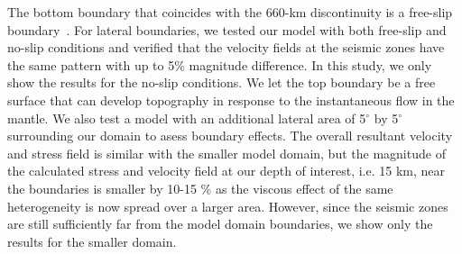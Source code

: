 \documentclass[draft,linenumbers]{agujournal2018}
\begin{document}
The bottom boundary that coincides with the 660-km discontinuity is a free-slip boundary~\citep[e.g.,][]{arcay2007slab, billen2007rheologic, quinquis2011role}. For lateral boundaries, we tested our model with both free-slip and no-slip conditions and verified that the velocity fields at the seismic zones have the same pattern with up to 5\% magnitude difference. In this study, we only show the results for the no-slip conditions. We let the top boundary be a free surface
that can develop topography in response to the instantaneous flow in the mantle. We also test a model with an additional lateral area of 5$^{\circ}$ by 5$^{\circ}$ surrounding our domain to asess boundary effects. The overall resultant velocity and stress field is similar with the smaller model domain, but the magnitude of the calculated stress and velocity field at our depth of interest, i.e. 15 km, near the boundaries is smaller by 10-15 \% as the viscous effect of the same heterogeneity is now spread over a larger area. However, since the seismic zones are still sufficiently far from the model domain boundaries, we show only the results for the smaller domain.
\end{document}
